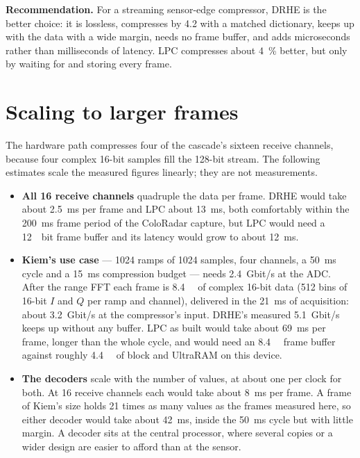 \begin{keybox}
\textbf{Recommendation.} For a streaming sensor-edge compressor, DRHE is the
better choice: it is lossless, compresses by \num{4.2} with a matched
dictionary, keeps up with the data with a wide margin, needs no frame buffer,
and adds microseconds rather than milliseconds of latency. LPC compresses about
\SI{4}{\percent} better, but only by waiting for and storing every frame.
\end{keybox}

\section{Scaling to larger frames}
\label{sec:scaling}

The hardware path compresses four of the cascade's sixteen receive channels,
because four complex 16-bit samples fill the 128-bit stream. The following
estimates scale the measured figures linearly; they are not measurements.

\begin{itemize}
\item \textbf{All 16 receive channels} quadruple the data per frame. DRHE would
take about \SI{2.5}{\milli\second} per frame and LPC about
\SI{13}{\milli\second}, both comfortably within the \SI{200}{\milli\second}
frame period of the ColoRadar capture, but LPC would need a
\SI{12}{\mebi bit} frame buffer and its latency would grow to about
\SI{12}{\milli\second}.
\item \textbf{Kiem's use case} --- 1024 ramps of 1024 samples, four channels,
a \SI{50}{\milli\second} cycle and a \SI{15}{\milli\second} compression budget
--- needs \SI{2.4}{Gbit/s} at the ADC. After the range FFT each frame is
\SI{8.4}{\mega\byte} of complex 16-bit data (512 bins of 16-bit $I$ and $Q$
per ramp and channel), delivered in the \SI{21}{\milli\second} of
acquisition: about \SI{3.2}{Gbit/s} at the compressor's input. DRHE's measured \SI{5.1}{Gbit/s} keeps up without any
buffer. LPC as built would take about \SI{69}{\milli\second} per
frame, longer than the whole cycle, and would need an \SI{8.4}{\mega\byte} frame
buffer against roughly \SI{4.4}{\mega\byte} of block and UltraRAM on this device.
\item \textbf{The decoders} scale with the number of values, at about one per
clock for both. At 16 receive channels each would take about
\SI{8}{\milli\second} per frame. A frame of Kiem's size holds 21 times as many
values as the frames measured here, so either decoder would take about
\SI{42}{\milli\second}, inside the \SI{50}{\milli\second} cycle but with little
margin. A decoder sits at the central processor, where several copies or a
wider design are easier to afford than at the sensor.
\end{itemize}

